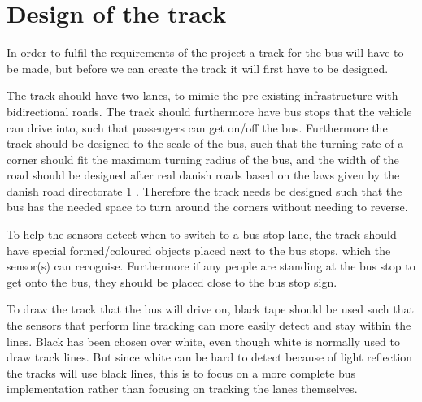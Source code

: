 \section{Design of the track} 

In order to fulfil the requirements of the project a track for the bus will have to be made, but before we can create the track it will first have to be designed.

The track should have two lanes, to mimic the pre-existing infrastructure with bidirectional roads. The track should furthermore have bus stops that the vehicle can drive into, such that passengers can get on/off the bus.
Furthermore the track should be designed to the scale of the bus, such that the turning rate of a corner should fit the maximum turning radius of the bus, and the width of the road should be designed after real danish roads based on the laws given by the danish road directorate \ref{} . Therefore the track needs be designed such that the bus has the needed space to turn around the corners without needing to reverse.

To help the sensors detect when to switch to a bus stop lane, the track should have special formed/coloured objects placed next to the bus stops, which the sensor(s) can recognise. Furthermore if any people are standing at the bus stop to get onto the bus, they should be placed close to the bus stop sign.

To draw the track that the bus will drive on, black tape should be used such that the sensors that perform line tracking can more easily detect and stay within the lines. Black has been chosen over white, even though white is normally used to draw track lines. But since white can be hard to detect because of light reflection the tracks will use black lines, this is to focus on a more complete bus implementation rather than focusing on tracking the lanes themselves.